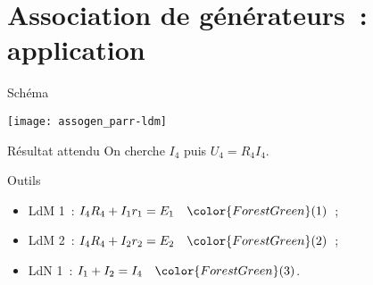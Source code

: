 \documentclass[a4paper, 12pt, final, garamond]{book}
\begin{document}
\section{Association de générateurs~: application}
\begin{tcbraster}[raster columns=2, raster equal height=rows]
    \begin{NCdefi}{Schéma}
        \begin{center}
            \texttt{[image: assogen\_parr-ldm]}
        \end{center}
    \end{NCdefi}
    \begin{tcolorbox}[blankest, space to=\myspace]
        \begin{tcbraster}[raster columns=1]
            \begin{NCprop}[add to natural height=\myspace]{Résultat attendu}
                On cherche $I_4$ puis $U_4 = R_4I_4$.
            \end{NCprop}
            \begin{NCrapp}{Outils}
                \begin{itemize}
                    \item LdM 1~: $I_4R_4 + I_1r_1 = E_1 \quad \color{ForestGreen}(1)$~;
                    \item LdM 2~: $I_4R_4 + I_2r_2 = E_2 \quad \color{ForestGreen}(2)$~;
                    \item LdN 1~: $I_1 + I_2 = I_4 \quad \color{ForestGreen}(3)$.
                \end{itemize}
            \end{NCrapp} 
        \end{tcbraster}
    \end{tcolorbox}
\end{tcbraster}
\end{document}
